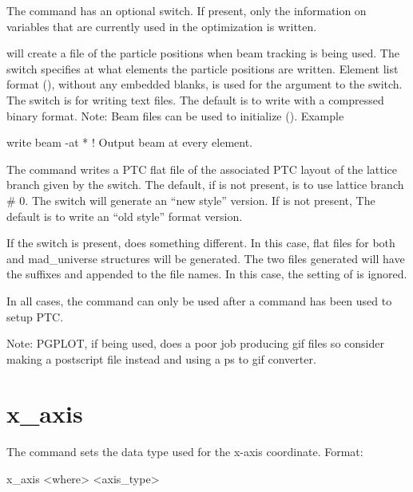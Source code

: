 {{{The  command has an optional 
switch.  If present, only the information on variables that are
currently used in the optimization is written.

 will create a file of the particle positions when
beam tracking is being used. The  switch specifies at what
elements the particle positions are written. Element list format
(), without any embedded blanks, is used for
the  argument to the  switch. The
 switch is for writing text files. The default is to write
with a compressed binary format.  Note: Beam files can be used to
initialize \tao (). Example
\begin{example}
  write beam -at *   ! Output beam at every element.
\end{example}

The  command writes a PTC flat file of the associated
PTC layout of the \bmad lattice branch given by the 
switch. The default, if  is not present, is to use lattice
branch \# 0. The  switch will generate an ``new style'' version.
If  is not present, The default is to write an ``old style'' format
version.

If the  switch is present,  does something
different.  In this case, flat files for both  and 
mad_universe structures will be generated. The two files generated
will have the suffixes  and  appended to the file
names. In this case, the setting of  is ignored.

In all cases, the  command can only be used
after a  command has been used to setup PTC.

Note: PGPLOT, if being used, does a poor job producing gif files so consider
making a postscript file instead and using a ps to gif converter.

\section{x_axis}
\label{s:x.axis}

The  command sets the data type used for the x-axis coordinate.
Format:
\begin{example}
  x_axis <where> <axis_type>
\end{example}

}}}
